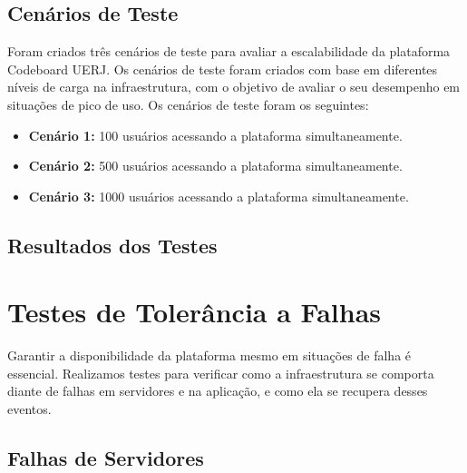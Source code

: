 \subsection{Cenários de Teste}

Foram criados três cenários de teste para avaliar a escalabilidade da plataforma Codeboard UERJ. Os cenários de teste foram criados com base em diferentes níveis de carga na infraestrutura, com o objetivo de avaliar o seu desempenho em situações de pico de uso. Os cenários de teste foram os seguintes:

\begin{itemize}
    \item \textbf{Cenário 1:} 100 usuários acessando a plataforma simultaneamente.
    \item \textbf{Cenário 2:} 500 usuários acessando a plataforma simultaneamente.
    \item \textbf{Cenário 3:} 1000 usuários acessando a plataforma simultaneamente.
\end{itemize}

\subsection{Resultados dos Testes}



\section{Testes de Tolerância a Falhas}

Garantir a disponibilidade da plataforma mesmo em situações de falha é essencial. Realizamos testes para verificar como a infraestrutura se comporta diante de falhas em servidores e na aplicação, e como ela se recupera desses eventos.


\subsection{Falhas de Servidores}

